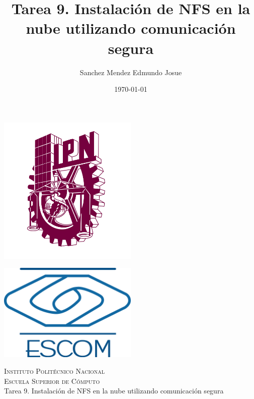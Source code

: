 \documentclass[11pt]{article}
\date{\today}
\title{Tarea 9. Instalación de NFS en la nube utilizando comunicación segura}
\author{Sanchez Mendez Edmundo Josue}
\begin{document}
		\begin{titlepage}
			\begin{center}
				
				
				\noindent
				\begin{minipage}{0.5\textwidth}
					\begin{flushleft} \large
						\includegraphics[width=0.5\textwidth]{resources/ipn.png}
					\end{flushleft}
				\end{minipage}%
				\begin{minipage}{0.55\textwidth}
					\begin{flushright} \large
						\includegraphics[width=0.5\textwidth]{resources/escom.png}
					\end{flushright}
				\end{minipage}
				
				\textsc{\LARGE Instituto Politécnico Nacional}\\[0.5cm]
				
				\textsc{\Large Escuela Superior de Cómputo}\\[1cm]
				
				
				{ \huge Tarea 9. Instalación de NFS en la nube utilizando comunicación segura \\[1cm] }
				

\end{center}
\end{titlepage}
\end{document}
